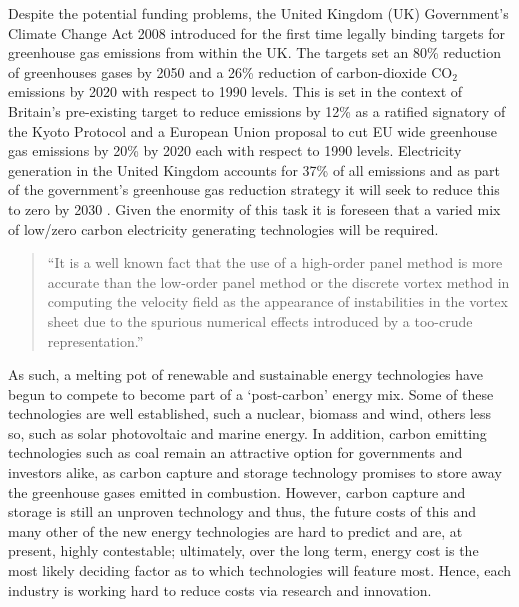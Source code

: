 Despite the potential funding problems, the United Kingdom (UK) Government's
Climate Change Act 2008 \citep*[see][2008]{CCA:2008:Defra} introduced for the
first time legally binding targets for greenhouse gas emissions from within the
UK. The targets set an 80\% reduction of greenhouses gases by 2050 and a 26\%
reduction of carbon-dioxide $\text{CO}_{2}$ emissions by 2020 with respect to
1990 levels. This is set in the context of Britain's pre-existing target to
reduce emissions by 12\% as a ratified signatory of the Kyoto Protocol
and a European Union proposal to cut EU wide greenhouse gas emissions by 20\% by
2020 each with respect to 1990 levels. Electricity generation in the United
Kingdom accounts for 37\% of all emissions and as part of the
government's greenhouse gas reduction strategy it will seek to reduce this to
zero by 2030 \citep[see][2008]{CCC:2008}. Given the enormity of this task it is
foreseen that a varied mix of low/zero carbon electricity generating
technologies will be required.
\begin{quote}
 ``It is a well known fact that the use of a high-order panel method is more
accurate than the
low-order panel method or the discrete vortex method in computing the velocity
field as the
appearance of instabilities in the vortex sheet due to the spurious numerical
effects introduced by
a too-crude representation.''
\end{quote}
As such, a melting pot of renewable and sustainable energy technologies have
begun to compete to become part of a `post-carbon' energy mix. Some of these
technologies are well established, such a nuclear, biomass and wind, others less
so, such as solar photovoltaic and marine energy. In addition, carbon emitting
technologies such as coal remain an attractive option for governments and
investors alike, as carbon capture and storage technology promises to store away
the greenhouse gases emitted in combustion. However, carbon capture and storage
is still an unproven technology and thus, the future costs of this and many
other of the new energy technologies are hard to predict and are, at present,
highly contestable; ultimately, over the long term, energy cost is the most
likely deciding factor as to which technologies will feature most. Hence, each
industry is working hard to reduce costs via research and innovation.
